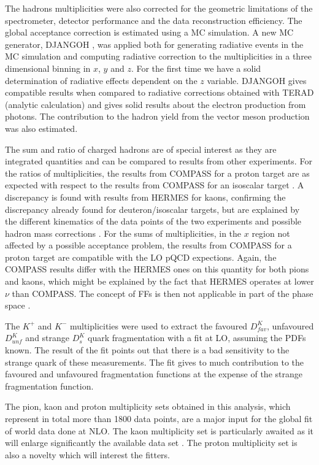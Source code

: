 The hadrons multiplicities were also corrected for the geometric limitations of the spectrometer, detector performance and the data reconstruction efficiency. The global acceptance correction is estimated using a MC simulation. A new MC generator, DJANGOH \cite{DJANGOH,DJANGOHnote}, was applied both for generating radiative events in the MC simulation and computing radiative correction to the multiplicities in a three dimensional binning in $x$, $y$ and $z$. For the first time we have a solid determination of radiative effects dependent on the $z$ variable. DJANGOH gives compatible results when compared to radiative corrections obtained with TERAD (analytic calculation) and gives solid results about the electron production from photons. The contribution to the hadron yield from the vector meson production was also estimated.

The sum and ratio of charged hadrons are of special interest as they are integrated quantities and can be compared to results from other experiments. For the ratios of multiplicities, the results from COMPASS for a proton target are as expected with respect to the results from COMPASS for an isoscalar target \cite{COMPASS2006Pi,COMPASS2006K}. A discrepancy is found with results from HERMES \cite{HERMESMult} for kaons, confirming the discrepancy already found for deuteron/isoscalar targets, but are explained by the different kinematics of the data points of the two experiments and possible hadron mass corrections \cite{Accardi,MarcinPubli}. For the sums of multiplicities, in the $x$ region not affected by a possible acceptance problem, the results from COMPASS for a proton target are compatible with the LO pQCD expections. Again, the COMPASS results differ with the HERMES ones on this quantity for both pions and kaons, which might be explained by the fact that HERMES operates at lower $\nu$ than COMPASS. The concept of FFs is then not applicable in part of the phase space \cite{MarcinPubli}.

The $K^+$ and $K^-$ multiplicities were used to extract the favoured $D^{K}_{fav}$, unfavoured $D^{K}_{unf}$ and strange $D^{K}_{s}$ quark fragmentation with a fit at LO, assuming the PDFs known. The result of the fit points out that there is a bad sensitivity to the strange quark of these measurements. The fit gives to much contribution to the favoured and unfavoured fragmentation functions at the expense of the strange fragmentation function.

The pion, kaon and proton multiplicity sets obtained in this analysis, which represent in total more than 1800 data points, are a major input for the global fit of world data done at NLO. The kaon multiplicity set is particularly awaited as it will enlarge significantly the available data set \cite{DIS2019}. The proton multiplicity set is also a novelty which will interest the fitters.

